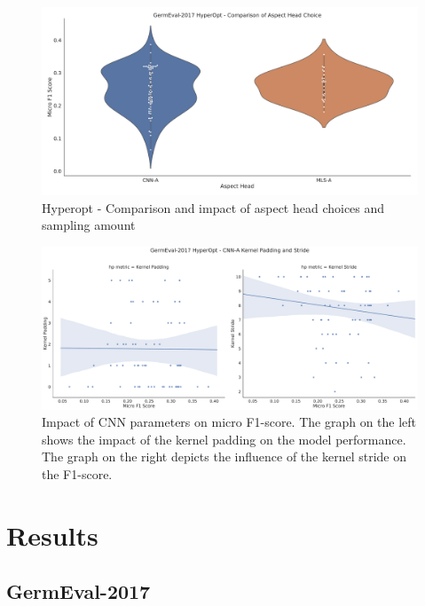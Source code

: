 \begin{figure}[H]
	\centering
	\includegraphics[width=\textwidth]{figures/06_results/06_hp_ge_vio_aspectHead_test}
	\caption{Hyperopt - Comparison and impact of aspect head choices and sampling amount}
	\label{fig:06_ge_aspectHeadChoices}
\end{figure}

\begin{figure}[H]
	\centering
	\includegraphics[width=\textwidth]{figures/06_results/06_hp_ge_lm_cnnParams2_test}
	\caption{Impact of CNN parameters on micro F1-score. The graph on the left shows the impact of the kernel padding on the model performance. The graph on the right depicts the influence of the kernel stride on the F1-score.}
	\label{fig:06_HpOptim_CnnParams2}
\end{figure}

\section{Results}

\subsection{GermEval-2017}

